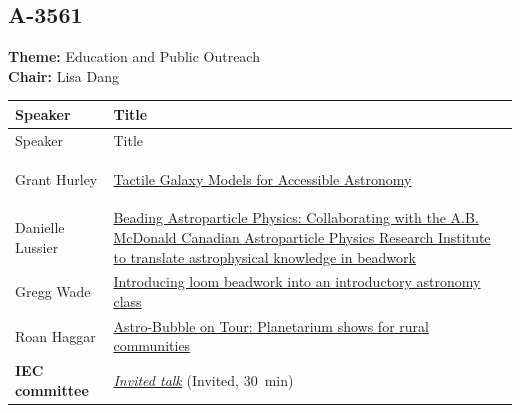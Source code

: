 \subsection*{A-3561}
\textbf{Theme:} Education and Public Outreach\\
\textbf{Chair:} Lisa Dang\\
{\small
{}
\sloppy
\setlength{\emergencystretch}{1em}
\begin{longtable}{@{}>{\TableRaggedRight\arraybackslash\hspace{0pt}}p{} >{\TableRaggedRight\arraybackslash\hspace{0pt}}p{}@{}}
\toprule
Speaker & Title \\
\midrule
\endfirsthead
\toprule
Speaker & Title \\
\midrule
\endhead
\hypertarget{schedule-talk-180}{}\label{schedule-page-talk-180}Grant Hurley & \hyperlink{abstract-talk-180}{Tactile Galaxy Models for Accessible Astronomy} \\
\hypertarget{schedule-talk-55}{}\label{schedule-page-talk-55}Danielle Lussier & \hyperlink{abstract-talk-55}{Beading Astroparticle Physics: Collaborating with the A.B. McDonald Canadian Astroparticle Physics Research Institute to translate astrophysical knowledge in beadwork} \\
\hypertarget{schedule-talk-11}{}\label{schedule-page-talk-11}Gregg Wade & \hyperlink{abstract-talk-11}{Introducing loom beadwork into an introductory astronomy class} \\
\hypertarget{schedule-talk-211}{}\label{schedule-page-talk-211}Roan Haggar & \hyperlink{abstract-talk-211}{Astro-Bubble on Tour: Planetarium shows for rural communities} \\
\hypertarget{invited-iec-committee-sched}{}\label{invited-page-iec-committee-sched}{\bfseries\color{cascagold}IEC committee} & \hyperlink{invited-iec-committee-sched}{\emph{Invited talk}} {\small\color{cascagold}(Invited, 30~min)} \\
\bottomrule
\end{longtable}
}

\hypertarget{schedule-thursday-afternoon-a-4502}{}
